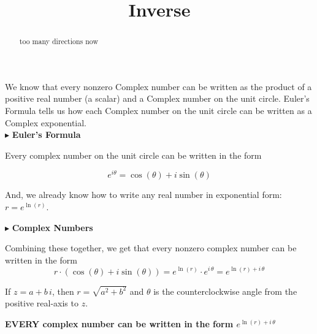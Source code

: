 \documentclass{ximera}
\title{Inverse}
\begin{document}
\begin{abstract}
too many directions now
\end{abstract}
\maketitle





We know that every nonzero Complex number can be written as the product of a positive real number (a scalar) and a Complex number on the unit circle.  Euler's Formula tells us how each Complex number on the unit circle can be written as a Complex exponential. \\




$\blacktriangleright$ \textbf{\textcolor{purple!85!blue}{Euler's Formula}}   


Every complex number on the unit circle can be written in the form


\[   e^{i \theta} = \cos(\theta) + i \sin(\theta)         \]


And, we already know how to write any real number in exponential form: $r = e^{\ln(r)}$.  





$\blacktriangleright$ \textbf{\textcolor{purple!85!blue}{Complex Numbers}}   




Combining these together, we get that every nonzero complex number can be written in the form  
\[
r \cdot (\cos(\theta) + i \sin(\theta))  = e^{\ln(r)} \cdot e^{i \, \theta} = e^{\ln(r) + i \, \theta}
\]



If $z = a + b \, i$, then $r = \sqrt{a^2 + b^2}$ and $\theta$ is the counterclockwise angle from the positive real-axis to $z$.




\begin{center}

\textbf{\textcolor{red!80!black}{EVERY complex number can be written in the form $e^{\ln(r) + i \, \theta}$}}

\end{center}
\end{document}
